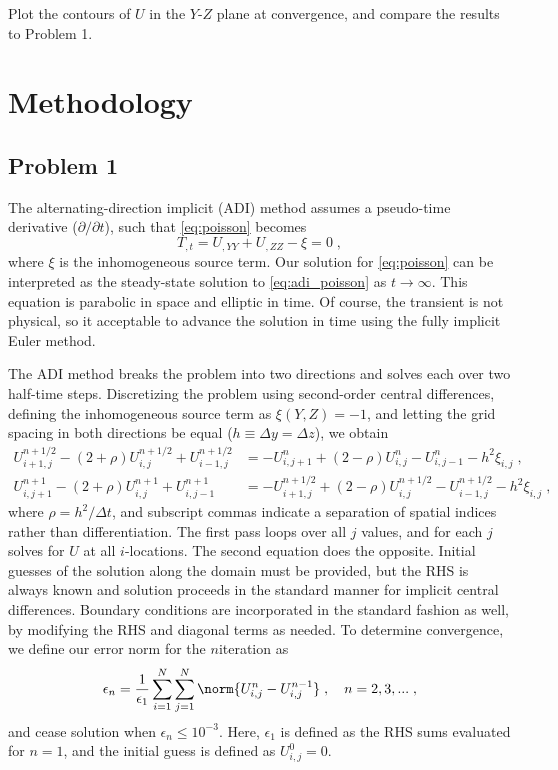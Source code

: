 \documentclass[11pt]{article}
\begin{document}
Plot the contours of $U$ in the $Y$-$Z$ plane at convergence, and compare the results to Problem 1.

\section{Methodology} %

\subsection{Problem 1}

The alternating-direction implicit (ADI) method assumes a pseudo-time derivative ($\partial/\partial t$), such that \eqref{eq:poisson} becomes
\begin{equation}
T_{,t} = U_{,YY} + U_{,ZZ} - \xi = 0
\;,
\label{eq:adi_poisson}
\end{equation}
where $\xi$ is the inhomogeneous source term. Our solution for \eqref{eq:poisson} can be interpreted as the steady-state solution to \eqref{eq:adi_poisson} as $t \rightarrow \infty$. This equation is parabolic in space and elliptic in time. Of course, the transient is not physical, so it acceptable to advance the solution in time using the fully implicit Euler method.

The ADI method breaks the problem into two directions and solves each over two half-time steps. Discretizing the problem using second-order central differences, defining the inhomogeneous source term as $\xi(Y,Z) = -1$, and letting the grid spacing in both directions be equal ($h \equiv \Delta y = \Delta z$), we obtain
\begin{align}
U_{i+1,j}^{n+1/2} - (2 + \rho) U_{i,j}^{n+1/2} + U_{i-1,j}^{n+1/2}
&=
-U_{i,j+1}^{n} + (2 - \rho) U_{i,j}^{n} - U_{i,j-1}^{n} - h^2 \xi_{i,j}
\;, \\
U_{i,j+1}^{n+1} - (2 + \rho) U_{i,j}^{n+1} + U_{i,j-1}^{n+1}
&=
-U_{i+1,j}^{n+1/2} + (2 - \rho) U_{i,j}^{n+1/2} - U_{i-1,j}^{n+1/2} - h^2 \xi_{i,j}
\;,
\end{align}
where $\rho = h^2 / \Delta t$, and subscript commas indicate a separation of spatial indices rather than differentiation. The first pass loops over all $j$ values, and for each $j$ solves for $U$ at all $i$-locations. The second equation does the opposite. Initial guesses of the solution along the domain must be provided, but the RHS is always known and solution proceeds in the standard manner for implicit central differences. Boundary conditions are incorporated in the standard fashion as well, by modifying the RHS and diagonal terms as needed. To determine convergence, we define our error norm for the $n$\th iteration as
\begin{equation}
\epsilon_n = \frac{1}{\epsilon_1} \sum_{i=1}^N \sum_{j=1}^N \norm{U_{i,j}^{n} - U_{i,j}^{n-1}}
\;, \quad
n = 2, 3, ...
\;,
\end{equation}
and cease solution when $\epsilon_n \le 10^{-3}$. Here, $\epsilon_1$ is defined as the RHS sums evaluated for $n=1$, and the initial guess is defined as $U_{i,j}^0 = 0$.
\end{document}
